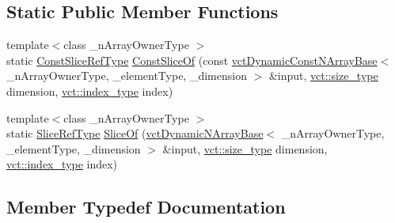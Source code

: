 \subsection*{Static Public Member Functions}
\begin{DoxyCompactItemize}
\item 
{\footnotesize template$<$class \+\_\+n\+Array\+Owner\+Type $>$ }\\static \hyperlink{classvct_dynamic_n_array_types_1_1_slices_types_acf1ea70846d0d2739fce728d3c99bde3}{Const\+Slice\+Ref\+Type} \hyperlink{classvct_dynamic_n_array_types_1_1_slices_types_abe488b76fc50cdd72bfb980b5a16398d}{Const\+Slice\+Of} (const \hyperlink{classvct_dynamic_const_n_array_base}{vct\+Dynamic\+Const\+N\+Array\+Base}$<$ \+\_\+n\+Array\+Owner\+Type, \+\_\+element\+Type, \+\_\+dimension $>$ \&input, \hyperlink{namespacevct_a3e2935e13aac4500965e00d30565775b}{vct\+::size\+\_\+type} dimension, \hyperlink{namespacevct_a50405d87494dce1f22ee3930ca285ee9}{vct\+::index\+\_\+type} index)
\item 
{\footnotesize template$<$class \+\_\+n\+Array\+Owner\+Type $>$ }\\static \hyperlink{classvct_dynamic_n_array_types_1_1_slices_types_a3eac136f0c4ca03f30cf55cdd608ebf8}{Slice\+Ref\+Type} \hyperlink{classvct_dynamic_n_array_types_1_1_slices_types_aacb59f2eecb005e20a53f952ee34f7af}{Slice\+Of} (\hyperlink{classvct_dynamic_n_array_base}{vct\+Dynamic\+N\+Array\+Base}$<$ \+\_\+n\+Array\+Owner\+Type, \+\_\+element\+Type, \+\_\+dimension $>$ \&input, \hyperlink{namespacevct_a3e2935e13aac4500965e00d30565775b}{vct\+::size\+\_\+type} dimension, \hyperlink{namespacevct_a50405d87494dce1f22ee3930ca285ee9}{vct\+::index\+\_\+type} index)
\end{DoxyCompactItemize}


\subsection{Member Typedef Documentation}
\hypertarget{classvct_dynamic_n_array_types_1_1_slices_types_acf1ea70846d0d2739fce728d3c99bde3}{}
